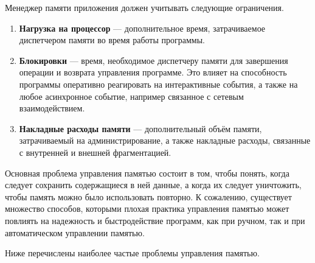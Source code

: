 Менеджер памяти приложения должен учитывать следующие ограничения.~\cite{mm_overview}

\begin{enumerate}[label*=\arabic*.]
	\item \textbf{Нагрузка на процессор} --- дополнительное время, затрачиваемое диспетчером памяти во время работы программы.
	\item \textbf{Блокировки} --- время, необходимое диспетчеру памяти для завершения операции и возврата управления программе. Это влияет на способность программы оперативно реагировать на интерактивные события, а также на любое асинхронное событие, например связанное с сетевым взаимодействием.
	\item \textbf{Накладные расходы памяти} --- дополнительный объём памяти, затрачиваемый на администрирование, а также накладные расходы, связанные с внутренней и внешней фрагментацией.
\end{enumerate}

Основная проблема управления памятью состоит в том, чтобы понять, когда следует сохранить содержащиеся в ней данные, а когда их следует уничтожить, чтобы память можно было использовать повторно. К сожалению, существует множество способов, которыми плохая практика управления памятью может повлиять на надежность и быстродействие программ, как при ручном, так и при автоматическом управлении памятью.

Ниже перечислены наиболее частые проблемы управления памятью.~\cite{mm_overview}


